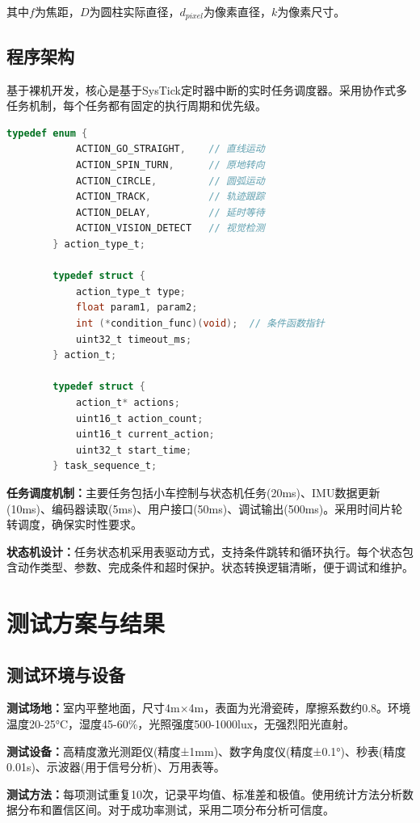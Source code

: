 \documentclass[UTF8]{ctexart}
\begin{document}
	其中$f$为焦距，$D$为圆柱实际直径，$d_{pixel}$为像素直径，$k$为像素尺寸。
	
	\subsection{程序架构}
	基于裸机开发，核心是基于SysTick定时器中断的实时任务调度器。采用协作式多任务机制，每个任务都有固定的执行周期和优先级。
	
	\begin{lstlisting}[language=C]
		typedef enum {
			ACTION_GO_STRAIGHT,    // 直线运动
			ACTION_SPIN_TURN,      // 原地转向
			ACTION_CIRCLE,         // 圆弧运动
			ACTION_TRACK,          // 轨迹跟踪
			ACTION_DELAY,          // 延时等待
			ACTION_VISION_DETECT   // 视觉检测
		} action_type_t;
		
		typedef struct {
			action_type_t type;
			float param1, param2;
			int (*condition_func)(void);  // 条件函数指针
			uint32_t timeout_ms;
		} action_t;
		
		typedef struct {
			action_t* actions;
			uint16_t action_count;
			uint16_t current_action;
			uint32_t start_time;
		} task_sequence_t;
	\end{lstlisting}
	
	\textbf{任务调度机制：}主要任务包括小车控制与状态机任务(20ms)、IMU数据更新(10ms)、编码器读取(5ms)、用户接口(50ms)、调试输出(500ms)。采用时间片轮转调度，确保实时性要求。
	
	\textbf{状态机设计：}任务状态机采用表驱动方式，支持条件跳转和循环执行。每个状态包含动作类型、参数、完成条件和超时保护。状态转换逻辑清晰，便于调试和维护。
	
	\section{测试方案与结果}
	
	\subsection{测试环境与设备}
	\textbf{测试场地：}室内平整地面，尺寸4m×4m，表面为光滑瓷砖，摩擦系数约0.8。环境温度20-25°C，湿度45-60\%，光照强度500-1000lux，无强烈阳光直射。
	
	\textbf{测试设备：}高精度激光测距仪(精度±1mm)、数字角度仪(精度±0.1°)、秒表(精度0.01s)、示波器(用于信号分析)、万用表等。
	
	\textbf{测试方法：}每项测试重复10次，记录平均值、标准差和极值。使用统计方法分析数据分布和置信区间。对于成功率测试，采用二项分布分析可信度。
	
\end{document}
